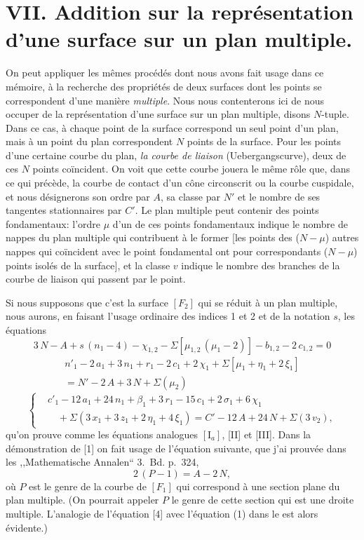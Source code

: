 \documentclass{article}
\begin{document}
\section*{VII. Addition sur la représentation d'une surface sur un plan multiple.}

On peut appliquer les mêmes procédés dont nous avons fait usage dans ce mémoire, à la recherche des propriétés de deux surfaces dont les points se correspondent d'une manière \emph{multiple}. Nous nous contenterons ici de nous occuper de la représentation d'une surface sur un plan multiple, disons $N$-tuple. Dans ce cas, à chaque point de la surface correspond un seul point d'un plan, mais à un point du plan correspondent $N$ points de la surface. Pour les points d'une certaine courbe du plan, \emph{la courbe de liaison} (Uebergangscurve), deux de ces $N$ points coïncident. On voit que cette courbe jouera le même rôle que, dans ce qui précède, la courbe de contact d'un cône circonscrit ou la courbe cuspidale, et nous désignerons son ordre par $A$, sa classe par $N'$ et le nombre de ses tangentes stationnaires par $C'$. Le plan multiple peut contenir des points fondamentaux: l'ordre $\mu$ d'un de ces points fondamentaux indique le nombre de nappes du plan multiple qui contribuent à le former [les points des ($N - \mu$) autres nappes qui coïncident avec le point fondamental ont pour correspondants ($N - \mu$) points isolés de la surface], et la classe $v$ indique le nombre des branches de la courbe de liaison qui passent par le point.

Si nous supposons que c'est la surface $[F_2]$ qui se réduit à un plan multiple, nous aurons, en faisant l'usage ordinaire des indices 1 et 2 et de la notation $s$, les équations
\[
3\,N - A + s\,(n_1 - 4) - \chi_{1, 2} - \Sigma[\mu_{1, 2}\,(\mu_1 - 2)] - b_{1, 2} - 2\,c_{1, 2} = 0 \tag*{[1]}
\]
\[
\begin{aligned}
n'_1 - 2\,a_1 + 3\,n_1 + r_1 - 2\,c_1 + 2\,\chi_1 + \Sigma[\mu_1 + \eta_1 + 2\,\xi_1] \\
= N' - 2\,A + 3\,N + \Sigma(\mu_2)
\end{aligned} \tag*{[2]}
\]
\[
\left\{
\begin{aligned}
& c'_1 - 12\,a_1 + 24\,n_1 + \beta_1 + 3\,r_1 - 15\,c_1 + 2\,\sigma_1 + 6\,\chi_1 \\
&\quad + \Sigma(3\,x_1 + 3\,z_1 + 2\,\eta_1 + 4\,\xi_1) = C' - 12\,A + 24\,N + \Sigma(3\,v_2),
\end{aligned}
\right. \tag*{[3]}
\]
qu'on prouve comme les équations analogues $[\mathrm{I}_a]$, [II] et [III]. Dans la démonstration de [1] on fait usage de l'équation suivante, que j'ai prouvée dans les ,,Mathematische Annalen`` 3.~Bd. p.~324,
\[
2\,(P - 1) = A - 2\,N, \tag*{[4]}
\]
où $P$ est le genre de la courbe de $[F_1]$ qui correspond à une section plane du plan multiple. (On pourrait appeler $P$ le genre de cette section qui est une droite multiple. L'analogie de l'équation [4] avec l'équation (1) dans le  est alors évidente.)
\end{document}
